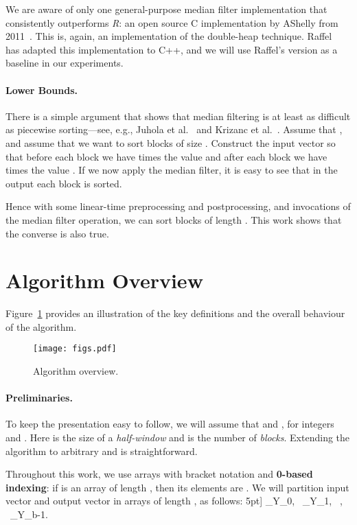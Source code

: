 \documentclass[a4paper,11pt]{article}
\begin{document}
We are aware of only one general-purpose median filter implementation that consistently outperforms \emph{R}: an open source C implementation by AShelly from 2011~. This is, again, an implementation of the double-heap technique. Raffel~ has adapted this implementation to C++, and we will use Raffel's version as a baseline in our experiments.


\paragraph{Lower Bounds.}

There is a simple argument that shows that median filtering is at least as difficult as piecewise sorting---see, e.g., Juhola et al.~\cite{juhola91comparison} and Krizanc et al.~\cite{krizanc05range-mode}. Assume that , and assume that we want to sort  blocks of size . Construct the input vector  so that before each block we have  times the value  and after each block we have  times the value . If we now apply the median filter, it is easy to see that in the output each block is sorted.

Hence with some linear-time preprocessing and postprocessing, and  invocations of the median filter operation, we can sort  blocks of length . This work shows that the converse is also true.


\section{Algorithm Overview}

Figure~\ref{fig:overview} provides an illustration of the key definitions and the overall behaviour of the algorithm.

\begin{figure}
    \centering
    \texttt{[image: figs.pdf]}
    \caption{Algorithm overview.}\label{fig:overview}
\end{figure}


\paragraph{Preliminaries.}
To keep the presentation easy to follow, we will assume that  and , for integers  and . Here  is the size of a \emph{half-window} and  is the number of \emph{blocks}. Extending the algorithm to arbitrary  and  is straightforward.

Throughout this work, we use arrays with bracket notation and \textbf{0-based indexing}: if  is an array of length , then its elements are . We will partition input vector  and output vector  in  arrays of length , as follows:
\newcommand{\myunderbrace}[2]{\underbrace{#1}_{\displaystyle #2}}
5pt]
    \myunderbrace{\bot, \dotsc, \bot, y_1}{Y_0},
    \ \myunderbrace{y_{2}, y_{3}, \dotsc, y_{k+1}}{Y_1},
    \ \dotsc,
    \ \myunderbrace{y_{bk-2k+2}, y_{bk-2k+3}, \dotsc, y_{bk-k+1}}{Y_{b-1}}.
\end{document}
